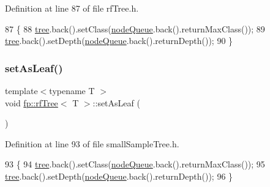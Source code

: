 Definition at line 87 of file rf\+Tree.\+h.


\begin{DoxyCode}
87                                        \{
88                     \hyperlink{classfp_1_1rfTree_a1d5c209715f4044a85878c17e2b3ee53}{tree}.back().setClass(\hyperlink{classfp_1_1rfTree_af72d0a2f930fd480dfb4858885c2df23}{nodeQueue}.back().returnMaxClass());
89                     \hyperlink{classfp_1_1rfTree_a1d5c209715f4044a85878c17e2b3ee53}{tree}.back().setDepth(\hyperlink{classfp_1_1rfTree_af72d0a2f930fd480dfb4858885c2df23}{nodeQueue}.back().returnDepth());
90                 \}
\end{DoxyCode}
\mbox{\label{classfp_1_1rfTree_a3583e1f1659ba9a9013a4891709bacb9}} 
\subsubsection{\texorpdfstring{set\+As\+Leaf()}{setAsLeaf()}\hspace{0.1cm}{\footnotesize\ttfamily [2/2]}}
{\footnotesize\ttfamily template$<$typename T $>$ \\
void \hyperlink{classfp_1_1rfTree}{fp\+::rf\+Tree}$<$ T $>$\+::set\+As\+Leaf (\begin{DoxyParamCaption}{ }\end{DoxyParamCaption})\hspace{0.3cm}{\ttfamily [inline]}}



Definition at line 93 of file small\+Sample\+Tree.\+h.


\begin{DoxyCode}
93                                        \{
94                     \hyperlink{classfp_1_1rfTree_a1d5c209715f4044a85878c17e2b3ee53}{tree}.back().setClass(\hyperlink{classfp_1_1rfTree_af72d0a2f930fd480dfb4858885c2df23}{nodeQueue}.back().returnMaxClass());
95                     \hyperlink{classfp_1_1rfTree_a1d5c209715f4044a85878c17e2b3ee53}{tree}.back().setDepth(\hyperlink{classfp_1_1rfTree_af72d0a2f930fd480dfb4858885c2df23}{nodeQueue}.back().returnDepth());
96                 \}
\end{DoxyCode}
\mbox{\label{classfp_1_1rfTree_a36abf82d31ca57670b09da16525dce0d}} 
